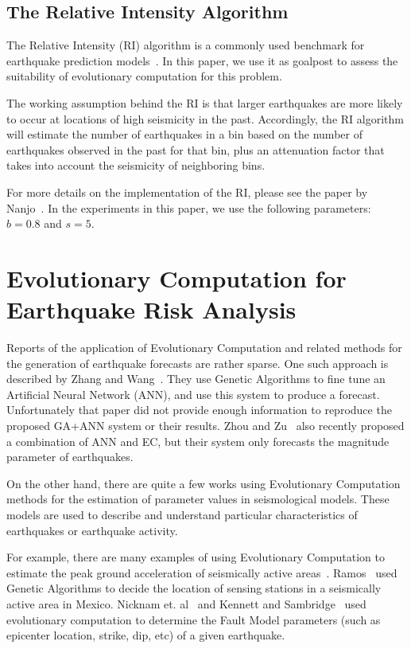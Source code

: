 \documentclass{sig-alternate}
\begin{document}
\subsection{The Relative Intensity Algorithm}

The Relative Intensity (RI) algorithm is a commonly used benchmark for
earthquake prediction models~\cite{Nanjo2011}. In this paper, we use
it as goalpost to assess the suitability of evolutionary computation
for this problem.

The working assumption behind the RI is that larger earthquakes are
more likely to occur at locations of high seismicity in the
past. Accordingly, the RI algorithm will estimate the number of
earthquakes in a bin based on the number of earthquakes observed in
the past for that bin, plus an attenuation factor that takes into
account the seismicity of neighboring bins.

For more details on the implementation of the RI, please see the paper
by Nanjo~\cite{Nanjo2011}. In the experiments in this paper, we use
the following parameters: $b = 0.8$ and $s = 5$.

\section{Evolutionary Computation for Earthquake Risk Analysis}

Reports of the application of Evolutionary Computation and related
methods for the generation of earthquake forecasts are rather sparse.
One such approach is described by Zhang and
Wang~\cite{Zhang2012}. They use Genetic Algorithms to fine tune an
Artificial Neural Network (ANN), and use this system to produce a
forecast. Unfortunately that paper did not provide enough information
to reproduce the proposed GA+ANN system or their results. Zhou and
Zu~\cite{Feiyan2014} also recently proposed a combination of ANN and
EC, but their system only forecasts the magnitude parameter of
earthquakes.

On the other hand, there are quite a few works using Evolutionary
Computation methods for the estimation of parameter values in
seismological models. These models are used to describe and understand
particular characteristics of earthquakes or earthquake activity.

For example, there are many examples of using Evolutionary Computation
to estimate the peak ground acceleration of seismically active
areas~\cite{Kermani2009, Cabalar2009,Kerh2010}. Ramos~\cite{Ramos2011}
used Genetic Algorithms to decide the location of sensing stations in
a seismically active area in Mexico. Nicknam et. al~\cite{Nicknam2010}
and Kennett and Sambridge~\cite{Kennett1992} used evolutionary
computation to determine the Fault Model parameters (such as epicenter
location, strike, dip, etc) of a given earthquake.
\end{document}

